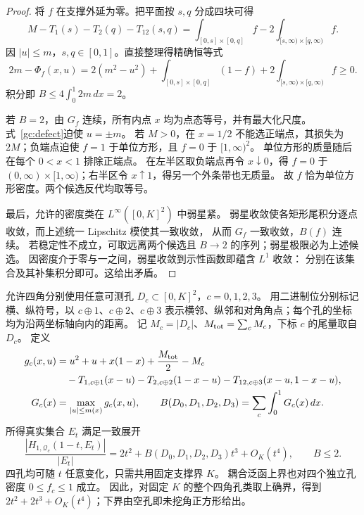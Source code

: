 \begin{proof}
将 $f$ 在支撑外延为零。把平面按 $s,q$ 分成四块可得
\[
 M-T_1(s)-T_2(q)-T_{12}(s,q)
 =\int_{[0,s]\times[0,q]}f-2\int_{[s,\infty)\times[q,\infty)}f.
\]
因 $|u|\le m$，$s,q\in[0,1]$。直接整理得精确恒等式
\begin{equation}\label{gc:defect}
 2m-\Phi_f(x,u)=2(m^2-u^2)
 +\int_{[0,s]\times[0,q]}(1-f)
 +2\int_{[s,\infty)\times[q,\infty)}f\ge0.
\end{equation}
积分即 $B\le4\int_0^1 2m\,dx=2$。

若 $B=2$，由 $G_f$ 连续，所有内点 $x$ 均为点态等号，并有最大化尺度。
式~\eqref{gc:defect}迫使 $u=\pm m$。
若 $M>0$，在 $x=1/2$ 不能选正端点，其损失为 $2M$；负端点迫使
$f=1$ 于单位方形，且 $f=0$ 于 $[1,\infty)^2$。
单位方形的质量随后在每个 $0<x<1$ 排除正端点。
在左半区取负端点再令 $x\downarrow0$，得 $f=0$ 于
$(0,\infty)\times[1,\infty)$；右半区令 $x\uparrow1$，得另一个外条带也无质量。
故 $f$ 恰为单位方形密度。两个候选反代均取等号。

最后，允许的密度类在 $L^\infty([0,K]^2)$ 中弱星紧。
弱星收敛使各矩形尾积分逐点收敛，而上述统一 Lipschitz 模使其一致收敛，
从而 $G_f$ 一致收敛，$B(f)$ 连续。
若稳定性不成立，可取远离两个候选且 $B\to2$ 的序列；弱星极限必为上述候选。
因密度介于零与一之间，弱星收敛到示性函数即蕴含 $L^1$ 收敛：
分别在该集合及其补集积分即可。这给出矛盾。
\end{proof}

\begin{theorem}[四个独立角孔的耦合上界]\label{gc:four}
允许四角分别使用任意可测孔 $D_c\subset[0,K]^2$，$c=0,1,2,3$。
用二进制位分别标记横、纵符号，以 $c\oplus1$、$c\oplus2$、$c\oplus3$
表示横邻、纵邻和对角角点；每个孔的坐标均为沿两坐标轴向内的距离。
记 $M_c=|D_c|$、$M_{\rm tot}=\sum_cM_c$，下标 $c$ 的尾量取自 $D_c$。
定义
\begin{align*}
 g_c(x,u)&=u^2+u+x(1-x)+\frac{M_{\rm tot}}2-M_c\\
 &\quad-T_{1,c\oplus1}(x-u)-T_{2,c\oplus2}(1-x-u)
 -T_{12,c\oplus3}(x-u,1-x-u),\\
 G_c(x)&=\max_{|u|\le m(x)}g_c(x,u),\qquad
 B(D_0,D_1,D_2,D_3)=\sum_c\int_0^1G_c(x)\,dx.
\end{align*}
所得真实集合 $E_t$ 满足一致展开
\[
 \frac{|H_{1,\mathcal Q_c}(1-t,E_t)|}{|E_t|}
 =2t^2+B(D_0,D_1,D_2,D_3)t^3+O_K(t^4),\qquad B\le2.
\]
四孔均可随 $t$ 任意变化，只需共用固定支撑界 $K$。
耦合泛函上界也对四个独立孔密度 $0\le f_c\le1$ 成立。
因此，对固定 $K$ 的整个四角孔类取上确界，得到
$2t^2+2t^3+O_K(t^4)$；下界由空孔即未挖角正方形给出。
\end{theorem}

